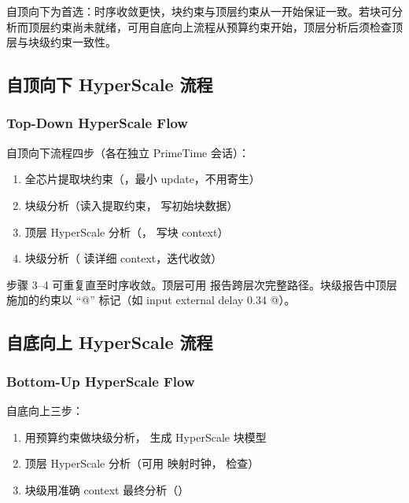 自顶向下为首选：时序收敛更快，块约束与顶层约束从一开始保证一致。若块可分析而顶层约束尚未就绪，可用自底向上流程从预算约束开始，顶层分析后须检查顶层与块级约束一致性。

\subsection{自顶向下 HyperScale 流程}
\subsubsection*{Top-Down HyperScale Flow}


自顶向下流程四步（各在独立 PrimeTime 会话）：
\begin{enumerate}
  \item 全芯片提取块约束（，最小 update，不用寄生）
  \item 块级分析（读入提取约束， 写初始块数据）
  \item 顶层 HyperScale 分析（， 写块 context）
  \item 块级分析（ 读详细 context，迭代收敛）
\end{enumerate}

步骤 3--4 可重复直至时序收敛。顶层可用  报告跨层次完整路径。块级报告中顶层施加的约束以 ``@'' 标记（如 input external delay 0.34 @）。

\subsection{自底向上 HyperScale 流程}
\subsubsection*{Bottom-Up HyperScale Flow}


自底向上三步：
\begin{enumerate}
  \item 用预算约束做块级分析， 生成 HyperScale 块模型
  \item 顶层 HyperScale 分析（可用  映射时钟， 检查）
  \item 块级用准确 context 最终分析（）
\end{enumerate}

